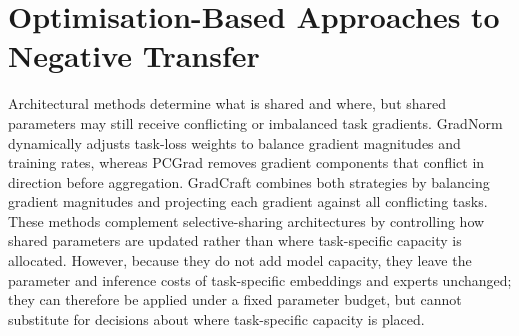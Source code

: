 \section{Optimisation-Based Approaches to Negative Transfer}

Architectural methods determine what is shared and where, but shared parameters may still receive conflicting or imbalanced task gradients. GradNorm \citep{Chen2018GradNorm} dynamically adjusts task-loss weights to balance gradient magnitudes and training rates, whereas PCGrad \citep{Yu2020PCGrad} removes gradient components that conflict in direction before aggregation. GradCraft \citep{Bai2024GradCraft} combines both strategies by balancing gradient magnitudes and projecting each gradient against all conflicting tasks. These methods complement selective-sharing architectures by controlling how shared parameters are updated rather than where task-specific capacity is allocated. However, because they do not add model capacity, they leave the parameter and inference costs of task-specific embeddings and experts unchanged; they can therefore be applied under a fixed parameter budget, but cannot substitute for decisions about where task-specific capacity is placed.
